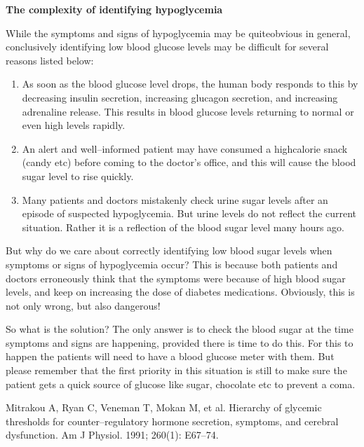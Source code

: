 \noindent\textbf{The complexity of identifying hypoglycemia}

While the symptoms and signs of hypoglycemia may be quite\break obvious in general, conclusively identifying low blood glucose levels may be difficult for several reasons listed below:

\vspace{-\topsep}
\begin{enumerate}[•]
\itemsep=0pt
\item As soon as the blood glucose level drops, the human body responds to this by decreasing insulin secretion, increasing glucagon secretion, and increasing adrenaline release. This results in blood glucose levels returning to normal or even high levels rapidly.
\item An alert and well–informed patient may have consumed a high\break calorie snack (candy etc) before coming to the doctor’s office, and this will cause the blood sugar level to rise quickly.
\item Many patients and doctors mistakenly check urine sugar levels after an episode of suspected hypoglycemia. But urine levels do not reflect the current situation. Rather it is a reflection of the blood sugar level many hours ago.
\end{enumerate}

But why do we care about correctly identifying low blood sugar levels when symptoms or signs of hypoglycemia occur? This is because both patients and doctors erroneously think that the symptoms were because of high blood sugar levels, and keep on increasing the dose of diabetes medications. Obviously, this is not only wrong, but also dangerous!

So what is the solution? The only answer is to check the blood sugar at the time symptoms and signs are happening, provided there is time to do this. For this to happen the patients will need to have a blood glucose meter with them. But please remember that the first priority in this situation is still to make sure the patient gets a quick source of glucose like sugar, chocolate etc to prevent a coma.

\begin{thebibliography}{99}
 Mitrakou A, Ryan C, Veneman T, Mokan M, et al. Hierarchy of glycemic thresholds for counter–regulatory hormone secretion, symptoms, and cerebral dysfunction. Am J Physiol. 1991; 260(1): E67–74.
 \end{thebibliography}

